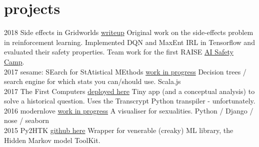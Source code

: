 \documentclass[]{friggeri-cv}
\begin{document}
\section{projects}
% 
\begin{entrylist}
  \entry
    {2018}
    {Side effects in Gridworlds}
    {\href{https://www.gleech.org/grids}{writeup}}
    {Original work on the side-effects problem in reinforcement learning. Implemented DQN and MaxEnt IRL in Tensorflow and evaluated their safety properties. Team work for the first RAISE \underline{\href{http://aisafety.camp/}{AI Safety Camp}}.}
\\
  \entry
    {2017}
    {sesame: SEarch for StAtistical MEthods}
    {\href{}{work in progress}}
    {Decision trees / search engine for which stats you can/should use. Scala.js}
\\
  \entry
    {2017}
    {The First Computers}
    {\href{https://www.gleech.org/first-computers/}{deployed here}}
    {Tiny app (and a conceptual analysis) to solve a historical question. Uses the Transcrypt Python transpiler - unfortunately.}
\\
  \entry
     {2016}
     {modernlove}
     {\href{}{work in progress}}
     {A visualiser for sexualities. Python / Django / nose / seaborn }
\\
  \entry
    {2015}
    {Py2HTK}
    {\href{https://github.com/g-leech/Py2HTK}{github here}}
    {Wrapper for venerable (creaky) ML library, the Hidden Markov model ToolKit. }

\end{entrylist}
\\\\
\end{document}
